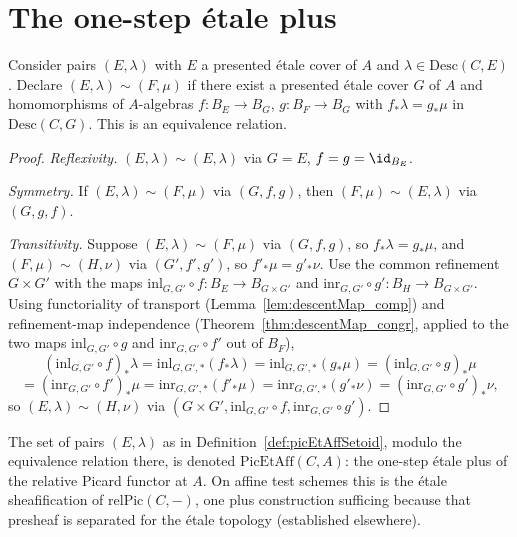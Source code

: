 \section{The one-step \'etale plus}

\begin{definition}
  \label{def:picEtAffSetoid}
  \leanok
  Consider pairs \((E,\lambda)\) with \(E\) a presented \'etale cover of \(A\) and
  \(\lambda \in \mathrm{Desc}(C,E)\). Declare \((E,\lambda) \sim (F,\mu)\) if there exist a
  presented \'etale cover \(G\) of \(A\) and homomorphisms of \(A\)-algebras
  \(f \colon B_E \to B_G\), \(g \colon B_F \to B_G\) with \(f_{*}\lambda = g_{*}\mu\) in
  \(\mathrm{Desc}(C,G)\). This is an equivalence relation.
\end{definition}
\begin{proof}
  \leanok
  \emph{Reflexivity.} \((E,\lambda) \sim (E,\lambda)\) via \(G = E\), \(f = g = \id_{B_E}\).

  \emph{Symmetry.} If \((E,\lambda) \sim (F,\mu)\) via \((G,f,g)\), then \((F,\mu) \sim
  (E,\lambda)\) via \((G,g,f)\).

  \emph{Transitivity.} Suppose \((E,\lambda) \sim (F,\mu)\) via \((G,f,g)\), so \(f_{*}\lambda =
  g_{*}\mu\), and \((F,\mu) \sim (H,\nu)\) via \((G',f',g')\), so \(f'_{*}\mu = g'_{*}\nu\). Use
  the common refinement \(G \times G'\) with the maps \(\mathrm{inl}_{G,G'} \circ f \colon B_E
  \to B_{G \times G'}\) and \(\mathrm{inr}_{G,G'} \circ g' \colon B_H \to B_{G \times G'}\).
  Using functoriality of transport (Lemma~\ref{lem:descentMap_comp}) and refinement-map
  independence (Theorem~\ref{thm:descentMap_congr}, applied to the two maps
  \(\mathrm{inl}_{G,G'} \circ g\) and \(\mathrm{inr}_{G,G'} \circ f'\) out of \(B_F\)),
  \[
    (\mathrm{inl}_{G,G'} \circ f)_{*}\lambda = \mathrm{inl}_{G,G',*}(f_{*}\lambda) =
    \mathrm{inl}_{G,G',*}(g_{*}\mu) = (\mathrm{inl}_{G,G'} \circ g)_{*}\mu
  \]
  \[
    = (\mathrm{inr}_{G,G'} \circ f')_{*}\mu = \mathrm{inr}_{G,G',*}(f'_{*}\mu) =
    \mathrm{inr}_{G,G',*}(g'_{*}\nu) = (\mathrm{inr}_{G,G'} \circ g')_{*}\nu,
  \]
  so \((E,\lambda) \sim (H,\nu)\) via \((G \times G', \mathrm{inl}_{G,G'} \circ f,
  \mathrm{inr}_{G,G'} \circ g')\).
\end{proof}

\begin{definition}
  \label{def:PicEtAff}
  \leanok
  The set of pairs \((E,\lambda)\) as in Definition~\ref{def:picEtAffSetoid}, modulo the
  equivalence relation there, is denoted \(\mathrm{PicEtAff}(C,A)\): the one-step \'etale plus
  of the relative Picard functor at \(A\). On affine test schemes this is the \'etale
  sheafification of \(\mathrm{relPic}(C,-)\), one plus construction sufficing because that
  presheaf is separated for the \'etale topology (established elsewhere).
\end{definition}

